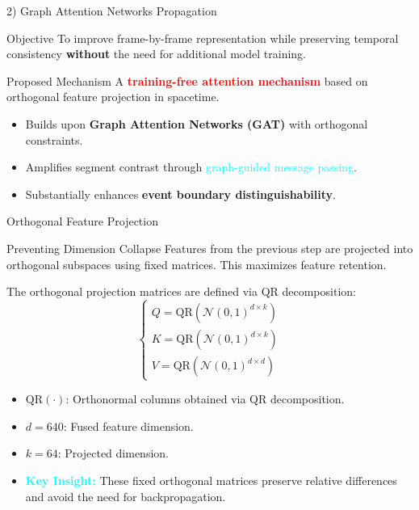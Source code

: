 \documentclass[aspectratio=169,xcolor=dvipsnames]{beamer}
\begin{document}
	
	
	\begin{frame}{2) Graph Attention Networks Propagation}
		\small
		
		\begin{block}{Objective}
			To improve frame-by-frame representation while preserving temporal
			consistency \textbf{without} the need for additional model training.
		\end{block}
		
		\begin{alertblock}{Proposed Mechanism}
			A \textbf{\textcolor{red}{training-free attention mechanism}} based on orthogonal feature projection in spacetime.
		\end{alertblock}
		
		\begin{itemize}
			\item Builds upon \textbf{Graph Attention Networks (GAT)} with orthogonal constraints.
			\item Amplifies segment contrast through \textcolor{cyan}{graph-guided message passing}.
			\item Substantially enhances \textbf{event boundary distinguishability}.
		\end{itemize}
	\end{frame}
	
	
	
	\begin{frame}{Orthogonal Feature Projection}
		\small
		
		\begin{block}{Preventing Dimension Collapse}
			Features from the previous step are projected into orthogonal subspaces using fixed matrices. This maximizes feature retention.
		\end{block}
		
		\vspace{0.5em}
		The orthogonal projection matrices are defined via QR decomposition:
		\[
		\begin{cases}
			Q = \mathrm{QR}(\mathcal{N}(0, 1)^{d \times k}) \\
			K = \mathrm{QR}(\mathcal{N}(0, 1)^{d \times k}) \\
			V = \mathrm{QR}(\mathcal{N}(0, 1)^{d \times d})
		\end{cases}
		\]
		
		\begin{itemize}
			\item $\mathrm{QR}(\cdot)$: Orthonormal columns obtained via QR decomposition.
			\item $d = 640$: Fused feature dimension.
			\item $k = 64$: Projected dimension.
			\item \textcolor{cyan}{\textbf{Key Insight:}} These fixed orthogonal matrices preserve relative differences and avoid the need for backpropagation.
		\end{itemize}
	\end{frame}
	
\end{document}

